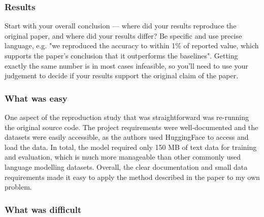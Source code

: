 \subsubsection*{Results}

Start with your overall conclusion --- where did your results reproduce the original paper, and where did your results differ? Be specific and use precise language, e.g. "we reproduced the accuracy to within 1\% of reported value, which supports the paper's conclusion that it outperforms the baselines". Getting exactly the same number is in most cases infeasible, so you'll need to use your judgement to decide if your results support the original claim of the paper.

\subsubsection*{What was easy}


One aspect of the reproduction study that was straightforward was re-running the original source code. The project requirements were well-documented and the datasets were easily accessible, as the authors used HuggingFace to access and load the data. In total, the model required only 150 MB of text data for training and evaluation, which is much more manageable than other commonly used language modelling datasets. Overall, the clear documentation and small data requirements made it easy to apply the method described in the paper to my own problem.

\subsubsection*{What was difficult}


